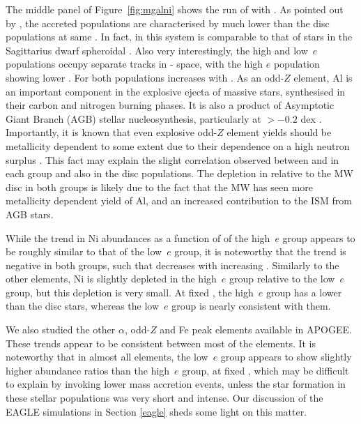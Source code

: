 The middle panel of Figure~\ref{fig:mgalni} shows the run of \alfe{}
with \feh{}.  As pointed out by \citet{2018ApJ...852...49H}, the
accreted populations are characterised by much lower \alfe{} than
the disc populations at same \feh{}.  In fact, \alfe{} in this
system is comparable to that of stars in the Sagittarius dwarf
spheroidal \citep{2017ApJ...845..162H}.  Also very interestingly,
the high and low~$e$ populations occupy separate tracks in
\alfe{}-\feh{} space, with the high $e$ population showing lower
\alfe{}.  For both populations \alfe{} increases with \feh{}. As
an odd-$Z$ element, Al is an important component in the explosive
ejecta of massive stars, synthesised in their carbon and nitrogen
burning phases. It is also a product of Asymptotic Giant Branch
(AGB) stellar nucleosynthesis, particularly at \feh{}$> -0.2$ dex
\citep[see, e.g.][]{2016arXiv160408613A}. Importantly, it is known
that even explosive odd-$Z$ element yields should be metallicity
dependent to some extent due to their dependence on a high neutron
surplus \citep[e.g.][]{1996snih.book.....A}. This fact may explain
the slight correlation observed between \alfe{} and \feh{} in each
group and also in the disc populations.  The depletion in \alfe{}
relative to the MW disc in both groups is likely due to the fact
that the MW has seen more metallicity dependent yield of Al, and
an increased contribution to the ISM from AGB stars.

While the trend in Ni abundances as a function of \feh{} of the
high~$e$ group appears to be roughly similar to that of the low~$e$
group, it is noteworthy that the trend is negative in both groups,
such that \nife{} decreases with increasing \feh{}.  Similarly to
the other elements, Ni is slightly depleted in the high~$e$ group
relative to the low~$e$ group, but this depletion is very small.
At fixed \feh{}, the high~$e$ group has a lower \nife{} than the
disc stars, whereas the low~$e$ group is nearly consistent
with them. 

We also studied the other $\alpha$, odd-$Z$ and Fe peak elements
available in APOGEE. These trends appear to be consistent between
most of the elements. It is noteworthy that in almost all elements,
the low~$e$ group appears to show slightly higher abundance ratios
than the high~$e$ group, at fixed \feh{}, which may be difficult
to explain by invoking lower mass accretion events, unless the star
formation in these stellar populations was very short and intense.
Our discussion of the EAGLE simulations in Section \ref{eagle} sheds
some light on this matter.  


